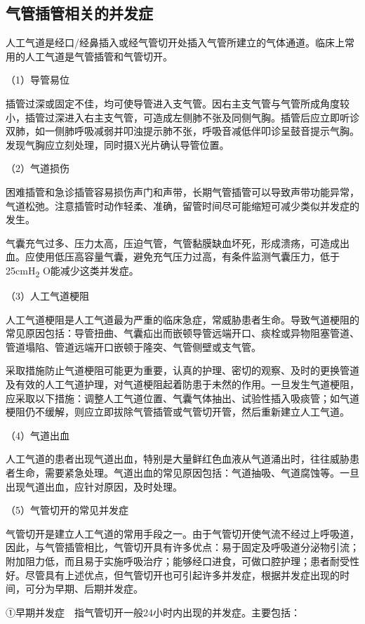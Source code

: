 \subsection{气管插管相关的并发症}

人工气道是经口/经鼻插入或经气管切开处插入气管所建立的气体通道。临床上常用的人工气道是气管插管和气管切开。

（1）导管易位

插管过深或固定不佳，均可使导管进入支气管。因右主支气管与气管所成角度较小，插管过深进入右主支气管，可造成左侧肺不张及同侧气胸。插管后应立即听诊双肺，如一侧肺呼吸减弱并叩浊提示肺不张，呼吸音减低伴叩诊呈鼓音提示气胸。发现气胸应立刻处理，同时摄X光片确认导管位置。

（2）气道损伤

困难插管和急诊插管容易损伤声门和声带，长期气管插管可以导致声带功能异常，气道松弛。注意插管时动作轻柔、准确，留管时间尽可能缩短可减少类似并发症的发生。

气囊充气过多、压力太高，压迫气管，气管黏膜缺血坏死，形成溃疡，可造成出血。应使用低压高容量气囊，避免充气压力过高，有条件监测气囊压力，低于25cmH\textsubscript{2}
O能减少这类并发症。

（3）人工气道梗阻

人工气道梗阻是人工气道最为严重的临床急症，常威胁患者生命。导致气道梗阻的常见原因包括：导管扭曲、气囊疝出而嵌顿导管远端开口、痰栓或异物阻塞管道、管道塌陷、管道远端开口嵌顿于隆突、气管侧壁或支气管。

采取措施防止气道梗阻可能更为重要，认真的护理、密切的观察、及时的更换管道及有效的人工气道护理，对气道梗阻起着防患于未然的作用。一旦发生气道梗阻，应采取以下措施：调整人工气道位置、气囊气体抽出、试验性插入吸痰管；如气道梗阻仍不缓解，则应立即拔除气管插管或气管切开管，然后重新建立人工气道。

（4）气道出血

人工气道的患者出现气道出血，特别是大量鲜红色血液从气道涌出时，往往威胁患者生命，需要紧急处理。气道出血的常见原因包括：气道抽吸、气道腐蚀等。一旦出现气道出血，应针对原因，及时处理。

（5）气管切开的常见并发症

气管切开是建立人工气道的常用手段之一。由于气管切开使气流不经过上呼吸道，因此，与气管插管相比，气管切开具有许多优点：易于固定及呼吸道分泌物引流；附加阻力低，而且易于实施呼吸治疗；能够经口进食，可做口腔护理；患者耐受性好。尽管具有上述优点，但气管切开也可引起许多并发症，根据并发症出现的时间，可分为早期、后期并发症。

①早期并发症　指气管切开一般24小时内出现的并发症。主要包括：


